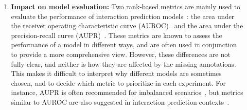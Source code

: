 \begin{enumerate}
    \item \textbf{Impact on model evaluation:} Two rank-based metrics are mainly used to evaluate the performance of interaction prediction models~\cite{pahikkala2015more,chen2018machine}: the area under the receiver operating characteristic curve (AUROC)~\cite{davis2006relationship,hand2009measuring} and the area under the precision-recall curve (AUPR)~\cite{davis2006relationship,ozenne2015precision,flach2015precisionrecallgain}. These metrics are known to assess the performance of a model in different ways, and are often used in conjunction to provide a more comprehensive view.
    However, these differences are not fully clear, and neither is how they are affected by the missing annotations.
    This makes it difficult to interpret why different models are sometimes chosen,
    and to decide which metric to prioritize in each experiment. For instance, AUPR is often recommended for imbalanced scenarios~\cite{davis2006relationship,hand2009measuring,he2009learning,ezzat2019computational}, but metrics similar to AUROC are also suggested in interaction prediction contexts~\cite{pahikkala2015more,johnsonlogistic,hao2019opensource,ezzat2019computational,yu2020fpscdtia}.
\end{enumerate}


